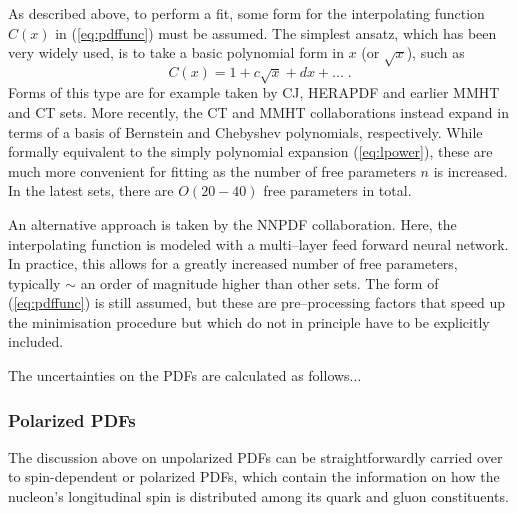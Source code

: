As described above, to perform a fit, some form for the interpolating function $C(x)$ in (\ref{eq:pdffunc}) must be assumed. The simplest ansatz, which has been very widely used, is to take a basic polynomial form in $x$ (or $\sqrt{x}$), such as
\begin{equation}\label{eq:lpower}
C(x)=1+c\sqrt{x}+d x+...\;.
\end{equation}
Forms of this type are for example taken by CJ, HERAPDF and earlier MMHT and CT sets. More recently, the CT and MMHT collaborations instead expand in terms of a basis of  Bernstein and Chebyshev polynomials, respectively.
While formally equivalent to the simply polynomial expansion (\ref{eq:lpower}), these are much more convenient for fitting as the number of free parameters $n$ is increased. In the latest sets, there are $O(20-40)$ free parameters in total.

An alternative approach is taken by the NNPDF collaboration. Here, the interpolating function is modeled with a multi--layer feed forward neural network. In practice, this allows for a greatly increased number of free parameters, typically $\sim$ an order of magnitude higher than other sets. The form of (\ref{eq:pdffunc}) is still assumed, but these are pre--processing factors that speed up the minimisation procedure but which do not in principle have to be explicitly included. 

The uncertainties on the PDFs are calculated as follows...

\subsubsection{Polarized PDFs}

The discussion above on unpolarized PDFs can be straightforwardly carried over to spin-dependent
or polarized PDFs, which contain the information on how the nucleon's longitudinal spin
is distributed among its quark and gluon constituents.
